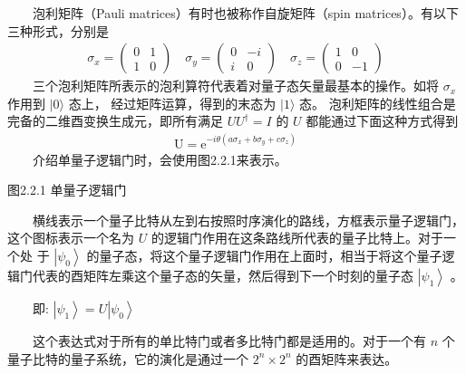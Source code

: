 \documentclass[a4paper,11pt,english]{sphinxmanual}
\let\sphinxpxdimen\pdfpxdimen\else\newdimen\sphinxpxdimen
\begin{document}
\sphinxAtStartPar
  泡利矩阵（Pauli matrices）有时也被称作自旋矩阵（spin matrices）。有以下三种形式，分别是
\begin{equation*}
\begin{split}\left.\sigma_{x}=\left(\begin{array}{rr} 0 & 1 \\ 1 & 0 \end{array}\right) \quad \sigma_{y}=\left(\begin{array}{cc} 0 & -i \\ i & 0 \end{array}\right) \quad \sigma_{z}=\left(\begin{array}{cc} 1 & 0 \\ 0 & -1 \end{array}\right)\right.\end{split}
\end{equation*}
\sphinxAtStartPar
  三个泡利矩阵所表示的泡利算符代表着对量子态矢量最基本的操作。如将  \(\sigma_{x}\) 作用到 \(|0\rangle\) 态上， 经过矩阵运算，得到的末态为  \(|1\rangle\) 态。 泡利矩阵的线性组合是完备的二维酉变换生成元，即所有满足  \(U U ^{\dagger}=I\) 的  \(U\) 都能通过下面这种方式得到
\begin{equation*}
\begin{split}\mathrm{U}=\mathrm{e}^{-i \theta\left(a \sigma_{x}+b \sigma_{y}+c \sigma_{z}\right)}\end{split}
\end{equation*}
\sphinxAtStartPar
  介绍单量子逻辑门时，会使用图2.2.1来表示。

\noindent{\hspace*{\fill}\sphinxincludegraphics[width=300\sphinxpxdimen]{{2.2.1}.png}\hspace*{\fill}}

\begin{center}图2.2.1 单量子逻辑门
\end{center}
\sphinxAtStartPar
  横线表示一个量子比特从左到右按照时序演化的路线，方框表示量子逻辑门， 这个图标表示一个名为 \(U\) 的逻辑门作用在这条路线所代表的量子比特上。对于一个处 于  \(\left|\psi_{0}\right\rangle\) 的量子态，将这个量子逻辑门作用在上面时，相当于将这个量子逻辑门代表的酉矩阵左乘这个量子态的矢量，然后得到下一个时刻的量子态  \(\left|\psi_{1}\right\rangle\) 。

\sphinxAtStartPar
  即:  \(\left|\psi_{1}\right\rangle=U\left|\psi_{0}\right\rangle\)

\sphinxAtStartPar
  这个表达式对于所有的单比特门或者多比特门都是适用的。对于一个有 \({n}\) 个量子比特的量子系统，它的演化是通过一个  \(2^{n} \times 2^{n}\) 的酉矩阵来表达。
\end{document}
